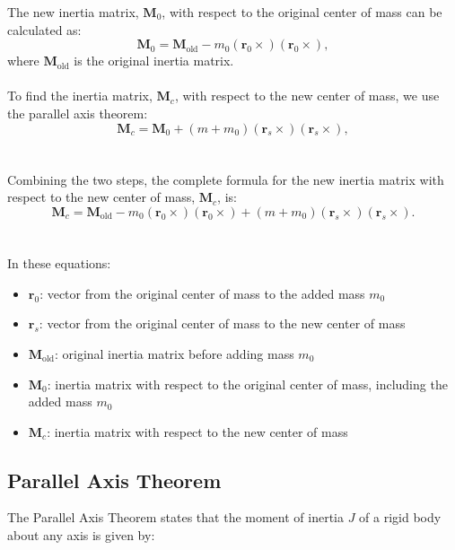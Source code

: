 The new inertia matrix, $\mathbf{M}_0$, with respect to the original center of mass can be calculated as:
\begin{equation}
    \mathbf{M}_0 = \mathbf{M}_{\text{old}} - m_0 \left( \mathbf{r}_0 \times \right) \left( \mathbf{r}_0 \times \right),
\end{equation}
where $\mathbf{M}_{\text{old}}$ is the original inertia matrix.
\\
\\
To find the inertia matrix, $\mathbf{M}_c$, with respect to the new center of mass, we use the parallel axis theorem:
\begin{equation}
    \mathbf{M}_c = \mathbf{M}_0 + (m + m_0) \left( \mathbf{r}_s \times \right) \left( \mathbf{r}_s \times \right),
\end{equation}
\\
\\
Combining the two steps, the complete formula for the new inertia matrix with respect to the new center of mass, $\mathbf{M}_c$, is:
\begin{equation}
    \mathbf{M}_c = \mathbf{M}_{\text{old}} - m_0 \left( \mathbf{r}_0 \times \right) \left( \mathbf{r}_0 \times \right) + (m + m_0) \left( \mathbf{r}_s \times \right) \left( \mathbf{r}_s \times \right).
\end{equation}
\\
\\
In these equations:
\begin{itemize}
    \item $\mathbf{r}_0$: vector from the original center of mass to the added mass $m_0$
    \item $\mathbf{r}_s$: vector from the original center of mass to the new center of mass
    \item $\mathbf{M}_{\text{old}}$: original inertia matrix before adding mass $m_0$
    \item $\mathbf{M}_0$: inertia matrix with respect to the original center of mass, including the added mass $m_0$
    \item $\mathbf{M}_c$: inertia matrix with respect to the new center of mass
\end{itemize}




\subsection{Parallel Axis Theorem}
The Parallel Axis Theorem states that the moment of inertia \(J\) of a rigid body about any axis is given by:

